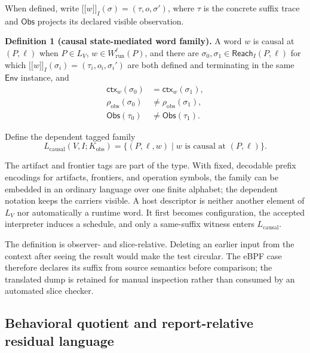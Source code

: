 \documentclass[conference]{IEEEtran}
\newcommand{\sem}[1]{\mathopen{[\![}#1\mathclose{]\!]}}
\begin{document}
When defined, write $\sem{w}_I(\sigma)=(\tau,o,\sigma')$, where $\tau$ is the concrete suffix trace and $\mathsf{Obs}$ projects its declared visible observation.

\medskip
\noindent\textbf{Definition 1 (causal state-mediated word family).}
A word $w$ is causal at $(P,\ell)$ when $P\in L_V$, $w\in W^\ell_{\mathrm{run}}(P)$, and there are $\sigma_0,\sigma_1\in\mathsf{Reach}_I(P,\ell)$ for which $\sem{w}_I(\sigma_i)=(\tau_i,o_i,\sigma_i')$ are both defined and terminating in the same $\mathsf{Env}$ instance, and
\begin{equation}
\begin{aligned}
\mathsf{ctx}_w(\sigma_0)&=\mathsf{ctx}_w(\sigma_1),\\
\rho_{\mathrm{obs}}(\sigma_0)&\ne\rho_{\mathrm{obs}}(\sigma_1),\\
\mathsf{Obs}(\tau_0)&\ne\mathsf{Obs}(\tau_1).
\end{aligned}
\end{equation}

Define the dependent tagged family
\begin{equation}
L_{\mathrm{causal}}(V,I;K_{\mathrm{obs}})
=
\{(P,\ell,w)\mid w\text{ is causal at }(P,\ell)\}.
\end{equation}

The artifact and frontier tags are part of the type. With fixed, decodable prefix encodings for artifacts, frontiers, and operation symbols, the family can be embedded in an ordinary language over one finite alphabet; the dependent notation keeps the carriers visible. A host descriptor is neither another element of $L_V$ nor automatically a runtime word. It first becomes configuration, the accepted interpreter induces a schedule, and only a same-suffix witness enters $L_{\mathrm{causal}}$.

The definition is observer- and slice-relative. Deleting an earlier input from the context after seeing the result would make the test circular. The eBPF case therefore declares its suffix from source semantics before comparison; the translated dump is retained for manual inspection rather than consumed by an automated slice checker.

\subsection{Behavioral quotient and report-relative residual language}
\end{document}
